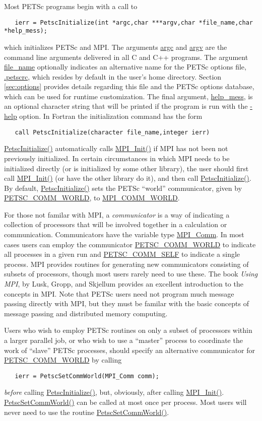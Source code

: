 Most PETSc programs begin with a call to 
\begin{verbatim}
   ierr = PetscInitialize(int *argc,char ***argv,char *file_name,char *help_mess);
\end{verbatim} 
which initializes PETSc and MPI.  The arguments \url{argc} and 
\url{argv} are the command line arguments delivered in all C and C++
programs.  The argument \url{file_name}
optionally indicates an alternative name for the PETSc options file,
\url{.petscrc}, which resides by default in the user's home directory.
Section \ref{sec:options} provides details regarding
this file and the PETSc options database, which can be used for runtime
customization. The final argument, \url{help_mess}, is an optional
character string that will be printed if the program is run with the
\url{-help} option.  In Fortran the initialization command has the form
\begin{verbatim}
   call PetscInitialize(character file_name,integer ierr)
\end{verbatim} 
\url{PetscInitialize()} automatically calls \url{MPI_Init()} if MPI
has not been not previously initialized. In certain 
circumstances in which MPI needs to be initialized directly (or is
initialized by some other library), the user should first call 
\url{MPI_Init()} (or have the other library do it), and then call
\url{PetscInitialize()}.
By default, \url{PetscInitialize()} sets the PETSc ``world''
communicator, given by \url{PETSC_COMM_WORLD}, to \url{MPI_COMM_WORLD}.

For those not familar with MPI, a {\em communicator} is a way of
indicating a collection of processors that will be involved together
in a calculation or communication. Communicators have the variable type
\url{MPI_Comm}. In most cases users can employ the communicator \url{
PETSC_COMM_WORLD} to indicate all processes in a given run and \url{
PETSC_COMM_SELF} to indicate a single process. MPI provides routines
for generating new communicators consisting of subsets of processors,
though most users rarely need to use these. The book {\em Using MPI},
by Lusk, Gropp, and Skjellum \cite{using-mpi} provides an excellent
introduction to the concepts in MPI. Note that PETSc users need not
program much message passing directly with MPI, but they must be
familar with the basic concepts of message passing and distributed
memory computing.

Users who wish to employ PETSc routines on only a subset
of processors within a larger parallel job, or who wish to use a
``master'' process to coordinate the work of ``slave'' PETSc
processes, should specify an alternative communicator for \url{
PETSC_COMM_WORLD} by calling 
\begin{verbatim}
   ierr = PetscSetCommWorld(MPI_Comm comm);
\end{verbatim}
{\em before} calling \url{PetscInitialize()}, but, obviously, after
calling \url{MPI_Init()}. \url{PetscSetCommWorld()} can be called
at most once per process. Most users will never need to use the routine
\url{PetscSetCommWorld()}.

